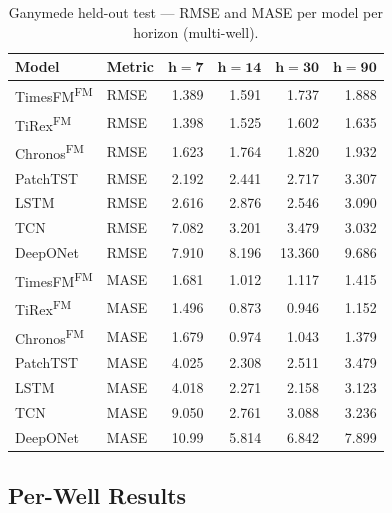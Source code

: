 \documentclass[11pt]{article}
\newcommand{\fm}{\textsuperscript{FM}}
\begin{document}
\begin{table}[ht]
\centering
\caption{Ganymede held-out test — RMSE and MASE per model per horizon (multi-well).}
\label{tab:ganymede_rmse_mase}
\scriptsize
\setlength{\tabcolsep}{2.5pt}
\begin{tabular}{@{}ll rrrr @{}}
\toprule
\textbf{Model} & \textbf{Metric} & $\boldsymbol{h{=}7}$ & $\boldsymbol{h{=}14}$ & $\boldsymbol{h{=}30}$ & $\boldsymbol{h{=}90}$ \\
\midrule
TimesFM\fm  & RMSE & 1.389 & 1.591 & 1.737 & 1.888 \\
TiRex\fm    & RMSE & 1.398 & 1.525 & 1.602 & 1.635 \\
Chronos\fm  & RMSE & 1.623 & 1.764 & 1.820 & 1.932 \\
PatchTST    & RMSE & 2.192 & 2.441 & 2.717 & 3.307 \\
LSTM        & RMSE & 2.616 & 2.876 & 2.546 & 3.090 \\
TCN         & RMSE & 7.082 & 3.201 & 3.479 & 3.032 \\
DeepONet    & RMSE & 7.910 & 8.196 & 13.360 & 9.686 \\
\midrule
TimesFM\fm  & MASE & 1.681 & 1.012 & 1.117 & 1.415 \\
TiRex\fm    & MASE & 1.496 & 0.873 & 0.946 & 1.152 \\
Chronos\fm  & MASE & 1.679 & 0.974 & 1.043 & 1.379 \\
PatchTST    & MASE & 4.025 & 2.308 & 2.511 & 3.479 \\
LSTM        & MASE & 4.018 & 2.271 & 2.158 & 3.123 \\
TCN         & MASE & 9.050 & 2.761 & 3.088 & 3.236 \\
DeepONet    & MASE & 10.99 & 5.814 & 6.842 & 7.899 \\
\bottomrule
\end{tabular}
\end{table}


\newpage
\subsection{Per-Well Results}
\end{document}
